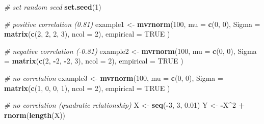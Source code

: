 \documentclass[]{book}
\newenvironment{Shaded}{\begin{snugshade}}{\end{snugshade}}
\newcommand{\KeywordTok}[1]{\textcolor[rgb]{0.13,0.29,0.53}{\textbf{#1}}}
\newcommand{\DataTypeTok}[1]{\textcolor[rgb]{0.13,0.29,0.53}{#1}}
\newcommand{\DecValTok}[1]{\textcolor[rgb]{0.00,0.00,0.81}{#1}}
\newcommand{\FloatTok}[1]{\textcolor[rgb]{0.00,0.00,0.81}{#1}}
\newcommand{\StringTok}[1]{\textcolor[rgb]{0.31,0.60,0.02}{#1}}
\newcommand{\CommentTok}[1]{\textcolor[rgb]{0.56,0.35,0.01}{\textit{#1}}}
\newcommand{\OtherTok}[1]{\textcolor[rgb]{0.56,0.35,0.01}{#1}}
\newcommand{\OperatorTok}[1]{\textcolor[rgb]{0.81,0.36,0.00}{\textbf{#1}}}
\newcommand{\NormalTok}[1]{#1}
\theoremstyle{definition}
\theoremstyle{definition}
\theoremstyle{definition}
\theoremstyle{remark}
\begin{document}
\begin{Shaded}
\begin{Highlighting}[]
\CommentTok{# set random seed}
\KeywordTok{set.seed}\NormalTok{(}\DecValTok{1}\NormalTok{)}

\CommentTok{# positive correlation (0.81)}
\NormalTok{example1 <-}\StringTok{ }\KeywordTok{mvrnorm}\NormalTok{(}\DecValTok{100}\NormalTok{,}
                    \DataTypeTok{mu =} \KeywordTok{c}\NormalTok{(}\DecValTok{0}\NormalTok{, }\DecValTok{0}\NormalTok{), }
                    \DataTypeTok{Sigma =} \KeywordTok{matrix}\NormalTok{(}\KeywordTok{c}\NormalTok{(}\DecValTok{2}\NormalTok{, }\DecValTok{2}\NormalTok{, }\DecValTok{2}\NormalTok{, }\DecValTok{3}\NormalTok{), }\DataTypeTok{ncol =} \DecValTok{2}\NormalTok{),}
                    \DataTypeTok{empirical =} \OtherTok{TRUE}
\NormalTok{                    )}

\CommentTok{# negative correlation (-0.81)}
\NormalTok{example2 <-}\StringTok{ }\KeywordTok{mvrnorm}\NormalTok{(}\DecValTok{100}\NormalTok{,}
                    \DataTypeTok{mu =} \KeywordTok{c}\NormalTok{(}\DecValTok{0}\NormalTok{, }\DecValTok{0}\NormalTok{), }
                    \DataTypeTok{Sigma =} \KeywordTok{matrix}\NormalTok{(}\KeywordTok{c}\NormalTok{(}\DecValTok{2}\NormalTok{, }\OperatorTok{-}\DecValTok{2}\NormalTok{, }\OperatorTok{-}\DecValTok{2}\NormalTok{, }\DecValTok{3}\NormalTok{), }\DataTypeTok{ncol =} \DecValTok{2}\NormalTok{),}
                    \DataTypeTok{empirical =} \OtherTok{TRUE}
\NormalTok{                    )}

\CommentTok{# no correlation }
\NormalTok{example3 <-}\StringTok{ }\KeywordTok{mvrnorm}\NormalTok{(}\DecValTok{100}\NormalTok{,}
                    \DataTypeTok{mu =} \KeywordTok{c}\NormalTok{(}\DecValTok{0}\NormalTok{, }\DecValTok{0}\NormalTok{), }
                    \DataTypeTok{Sigma =} \KeywordTok{matrix}\NormalTok{(}\KeywordTok{c}\NormalTok{(}\DecValTok{1}\NormalTok{, }\DecValTok{0}\NormalTok{, }\DecValTok{0}\NormalTok{, }\DecValTok{1}\NormalTok{), }\DataTypeTok{ncol =} \DecValTok{2}\NormalTok{),}
                    \DataTypeTok{empirical =} \OtherTok{TRUE}
\NormalTok{                    )}

\CommentTok{# no correlation (quadratic relationship)}
\NormalTok{X <-}\StringTok{ }\KeywordTok{seq}\NormalTok{(}\OperatorTok{-}\DecValTok{3}\NormalTok{, }\DecValTok{3}\NormalTok{, }\FloatTok{0.01}\NormalTok{)}
\NormalTok{Y <-}\StringTok{ }\OperatorTok{-}\NormalTok{X}\OperatorTok{^}\DecValTok{2} \OperatorTok{+}\StringTok{ }\KeywordTok{rnorm}\NormalTok{(}\KeywordTok{length}\NormalTok{(X))}


\end{Highlighting}
\end{Shaded}
\end{document}
